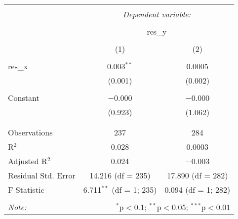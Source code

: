 
\begin{table}[!htbp] \centering 
  \caption{} 
  \label{} 
\begin{tabular}{@{\extracolsep{5pt}}lcc} 
\\[-1.8ex]\hline 
\hline \\[-1.8ex] 
 & \multicolumn{2}{c}{\textit{Dependent variable:}} \\ 
\cline{2-3} 
\\[-1.8ex] & \multicolumn{2}{c}{res\_y} \\ 
\\[-1.8ex] & (1) & (2)\\ 
\hline \\[-1.8ex] 
 res\_x & 0.003$^{**}$ & 0.0005 \\ 
  & (0.001) & (0.002) \\ 
  & & \\ 
 Constant & $-$0.000 & $-$0.000 \\ 
  & (0.923) & (1.062) \\ 
  & & \\ 
\hline \\[-1.8ex] 
Observations & 237 & 284 \\ 
R$^{2}$ & 0.028 & 0.0003 \\ 
Adjusted R$^{2}$ & 0.024 & $-$0.003 \\ 
Residual Std. Error & 14.216 (df = 235) & 17.890 (df = 282) \\ 
F Statistic & 6.711$^{**}$ (df = 1; 235) & 0.094 (df = 1; 282) \\ 
\hline 
\hline \\[-1.8ex] 
\textit{Note:}  & \multicolumn{2}{r}{$^{*}$p$<$0.1; $^{**}$p$<$0.05; $^{***}$p$<$0.01} \\ 
\end{tabular} 
\end{table} 
